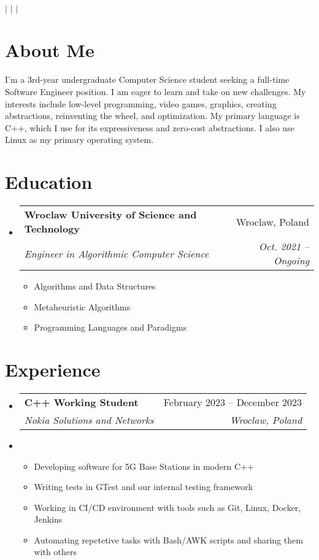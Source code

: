 \documentclass[letterpaper,11pt]{article}
\makeatletter
\newcommand{\resumeItem}[1]{
  \item\small{
    {#1 \vspace{-2pt}}
  }
}
\newcommand{\resumeItemListHeading}[1]{
  \small{
    {\vspace{10pt} \hspace{-16pt} \textbf{#1}: \vspace{-4pt}}
  }
}
\newcommand{\resumeSubheading}[4]{
  \vspace{-2pt}\item
    \begin{tabular*}{0.97\textwidth}[t]{l@{\extracolsep{\fill}}r}
      \textbf{#1} & #2 \\
      \textit{\small#3} & \textit{\small #4} \\
    \end{tabular*}\vspace{-7pt}
}
\newcommand{\resumeSubHeadingListStart}{\begin{itemize}[leftmargin=0.15in, label={}]}
\newcommand{\resumeSubHeadingListEnd}{\end{itemize}}
\newcommand{\resumeItemListStart}{\begin{itemize}}
\newcommand{\resumeItemListEnd}{\end{itemize}\vspace{-5pt}}
\makeatother
\begin{document}
\begin{center}
    \textbf{\Huge \scshape \myName} \\ \vspace{1pt}
    \small 
        {\myPhoneNumber} $|$
        {\expandafter\href\expandafter{mailto:\myEmail}{\underline{\myEmail}}} $|$
        {\expandafter\href\expandafter{https://www.\myLinkedIn}{\underline{\myLinkedIn}}} $|$
        {\expandafter\href\expandafter{https://www.\myGithub}{\underline{\myGithub}}}
\end{center}


\section{About Me}
    \begin{adjustwidth}{8pt}{4pt}
    \hspace{8pt}
    \small{I'm a 3rd-year undergraduate Computer Science student seeking a full-time Software Engineer position. I am eager to learn and take on new challenges. My interests include low-level programming, video games, graphics, creating abstractions, reinventing the wheel, and optimization. My primary language is C++, which I use for its expressiveness and zero-cost abstractions. I also use Linux as my primary operating system.}
    \end{adjustwidth}
\section{Education}
  \resumeSubHeadingListStart
    \resumeSubheading
      {Wroclaw University of Science and Technology}{Wroclaw, Poland}
      {Engineer in Algorithmic Computer Science}{Oct. 2021 -- Ongoing}
    \resumeItemListStart
        \resumeItemListHeading{Relevant coursework}
        \resumeItem{Algorithms and Data Structures}
        \resumeItem{Metaheuristic Algorithms}
        \resumeItem{Programming Languages and Paradigms}
    \resumeItemListEnd
  \resumeSubHeadingListEnd

\section{Experience}
  \resumeSubHeadingListStart
    \resumeSubheading
        {C++ Working Student}{February 2023 -- December 2023}
        {Nokia Solutions and Networks}{Wroclaw, Poland}
    \resumeItem{
        \resumeItemListStart
            \resumeItem{Developing software for 5G Base Stations in modern C++}
            \resumeItem{Writing tests in GTest and our internal testing framework}
            \resumeItem{Working in CI/CD environment with tools such as Git, Linux, Docker, Jenkins}
            \resumeItem{Automating repetetive tasks with Bash/AWK scripts and sharing them with others}
        \resumeItemListEnd
    }
  \resumeSubHeadingListEnd
\end{document}
